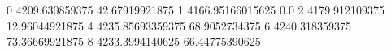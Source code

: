 0 4209.630859375 42.67919921875
1 4166.95166015625 0.0
2 4179.912109375 12.96044921875
4 4235.85693359375 68.9052734375
6 4240.318359375 73.36669921875
8 4233.3994140625 66.44775390625
